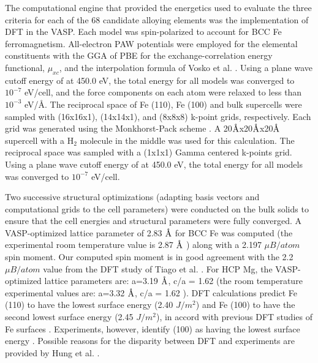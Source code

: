 The computational engine that provided the energetics used to evaluate the three criteria for each of the 68 candidate alloying elements was the implementation of \ac{DFT} in the \ac{VASP}. Each model was spin-polarized to account for \ac{BCC} Fe ferromagnetism. All-electron \ac{PAW} potentials were employed for the elemental constituents with the \ac{GGA} of \ac{PBE} for the exchange-correlation energy functional, $\mu_{xc}$, and the interpolation formula of Vosko et al. \cite{vosko1980accurate}. Using a plane wave cutoff energy of at 450.0 eV, the total energy for all models was converged to $10^{−7}$ eV/cell, and the force components on each atom were relaxed to less than $10^{−3}$ eV/Å. The reciprocal space of Fe (110), Fe (100) and bulk supercells were sampled with (16x16x1), (14x14x1), and (8x8x8) k-point grids, respectively. Each grid was generated using the Monkhorst-Pack scheme \cite{monkhorst1976special}. A 20$\mbox{\normalfont\AA}$x20$\mbox{\normalfont\AA}$x20$\mbox{\normalfont\AA}$ supercell with a $\text{H}_2$ molecule in the middle was used for this calculation. The reciprocal space was sampled with a (1x1x1) Gamma centered k-points grid. Using a plane wave cutoff energy of at 450.0 eV, the total energy for all models was converged to $10^{−7}$ eV/cell.

Two successive structural optimizations (adapting basis vectors and computational grids to the cell parameters) were conducted on the bulk solids to ensure that the cell energies and structural parameters were fully converged. A \ac{VASP}-optimized lattice parameter of 2.83 $\mbox{\normalfont\AA}$ for \ac{BCC} Fe was computed (the experimental room temperature value is 2.87 $\mbox{\normalfont\AA}$ \cite{kohlhaas1967temperature}) along with a 2.197 $\mu B/atom$ spin moment. Our computed spin moment is in good agreement with the 2.2 $\mu B/atom$ value from the \ac{DFT} study of Tiago et al. \cite{tiago2006evolution}. For \ac{HCP} Mg, the VASP-optimized lattice parameters are: a=3.19 $\mbox{\normalfont\AA}$, c/a = 1.62 (the room temperature experimental values are: a=3.32 $\mbox{\normalfont\AA}$, c/a = 1.62 \cite{wrobel2012thermodynamic}). DFT calculations predict Fe (110) to have the lowest surface energy (2.40 $J/m^2$) and Fe (100) to have the second lowest surface energy (2.45 $J/m^2$), in accord with previous DFT studies of Fe surfaces \cite{hung2002first}.  Experiments, however, identify (100) as having the lowest surface energy \cite{tyson1977surface}. Possible reasons for the disparity between DFT and experiments are provided by Hung et al. \cite{hung2002first}.

